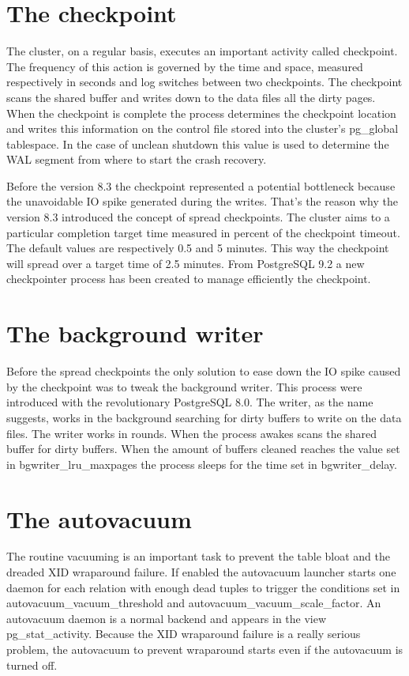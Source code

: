 \section{The checkpoint}
The cluster, on a regular basis, executes an important activity called checkpoint. The frequency 
of this action is governed by the time and space, measured respectively in seconds and log switches between 
two checkpoints. The checkpoint scans the shared buffer and writes down to the data files all the dirty 
pages. When the checkpoint is complete the process determines the checkpoint location and writes this 
information on the control file stored into the cluster's pg\_global tablespace. In the case of unclean 
shutdown this value is used to determine the WAL segment from where to start the crash recovery. \newline

Before the version 8.3 the checkpoint represented a potential bottleneck because the unavoidable IO spike 
generated during the writes. That's the reason why the version 8.3 introduced the concept of spread 
checkpoints. The cluster aims to a particular completion target time measured in percent of the checkpoint 
timeout. The default values are respectively 0.5 and 5 minutes. This way the checkpoint will spread over a 
target time of 2.5 minutes. From PostgreSQL 9.2 a new checkpointer process has been created to manage 
efficiently the checkpoint.


\section{The background writer}
Before the spread checkpoints the only solution to ease down the IO spike caused by the checkpoint was to 
tweak the background writer. This process were introduced with the revolutionary PostgreSQL 8.0. The 
writer, as the name suggests, works in the background searching for dirty buffers to write on the data 
files. The writer works in rounds. When the process awakes scans the shared buffer for dirty buffers. When 
the amount of buffers cleaned reaches the value set in bgwriter\_lru\_maxpages the process sleeps for the 
time set in bgwriter\_delay. 

\section{The autovacuum}
The routine vacuuming is an important task to prevent the table bloat and the dreaded XID wraparound 
failure. If enabled the autovacuum launcher starts one daemon for each relation with enough dead tuples to 
trigger the conditions set in autovacuum\_vacuum\_threshold and autovacuum\_vacuum\_scale\_factor. An 
autovacuum daemon is a normal backend and appears in the view pg\_stat\_activity. Because the XID wraparound 
failure is a really serious problem, the autovacuum to prevent wraparound starts even if the autovacuum is 
turned off.

